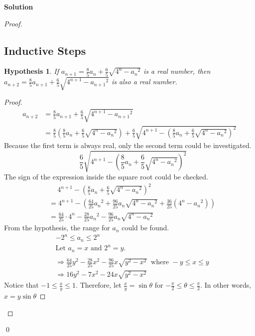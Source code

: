 \documentclass{article}
\newtheorem*{hypothesis*}{Hypothesis}
\newenvironment{solution}{\begin{trivlist}\item[]{\bf Solution}}{\qed \end{trivlist}}
\begin{document}
\begin{solution}
\begin{proof}
    \subsection*{Inductive Steps}
    \begin{hypothesis*}
        If $a_{n + 1} = \frac{8}{5} a_n + \frac{6}{5} \sqrt{4^n - {a_n}^2}$ is a real number, then $a_{n + 2} = \frac{8}{5} a_{n + 1} + \frac{6}{5} \sqrt{4^{n + 1} - {a_{n + 1}}^2}$ is also a real number. 
    \end{hypothesis*}
    \begin{proof}
        \begin{align*}
            a_{n + 2}
            &= \frac{8}{5} a_{n + 1} + \frac{6}{5} \sqrt{4^{n + 1} - {a_{n + 1}}^2} \\
            &= \frac{8}{5} \left( \frac{8}{5} a_n + \frac{6}{5} \sqrt{4^n - {a_n}^2} \right) + \frac{6}{5} \sqrt{4^{n + 1} - \left( \frac{8}{5} a_n + \frac{6}{5} \sqrt{4^n - {a_n}^2} \right)^2}
        \end{align*}
        Because the first term is always real, only the second term could be investigated.
        \[
        \quad \frac{6}{5} \sqrt{4^{n + 1} - \left( \frac{8}{5} a_n + \frac{6}{5} \sqrt{4^n - {a_n}^2} \right)^2}
        \]
        The sign of the expression inside the square root could be checked.
        \begin{align*}
            &\quad\ 4^{n + 1} - \left( \frac{8}{5} a_n + \frac{6}{5} \sqrt{4^n - {a_n}^2} \right)^2 \\
            &= 4^{n + 1} - \left( \frac{64}{25} {a_n}^2 + \frac{96}{25} a_n \sqrt{4^n - {a_n}^2} + \frac{36}{25} (4^n - {a_n}^2) \right) \\
            &= \frac{64}{25} \cdot 4^n - \frac{28}{25} {a_n}^2 - \frac{96}{25} a_n \sqrt{4^n - {a_n}^2}
        \end{align*}
        From the hypothesis, the range for $a_n$ could be found.
        \begin{align*}
            &-2^n \le a_n \le 2^n \\
            &\text{Let $a_n = x$ and $2^n = y$.}
            \\\\
            &\Rightarrow \frac{64}{25} y^2 - \frac{28}{25} x^2 - \frac{96}{25} x \sqrt{y^2 - x^2} \ \text{ where } -y \le x \le y \\
            &\Rightarrow 16 y^2 - 7 x^2 - 24 x \sqrt{y^2 - x^2}
        \end{align*}
        Notice that $-1 \le \frac{x}{y} \le 1$. Therefore, let $\frac{x}{y} = \sin\theta$ for $-\frac{\pi}{2} \le \theta \le \frac{\pi}{2}$. In other words, $x = y \sin\theta$

\end{proof}
\end{proof}
\end{solution}
\end{document}

